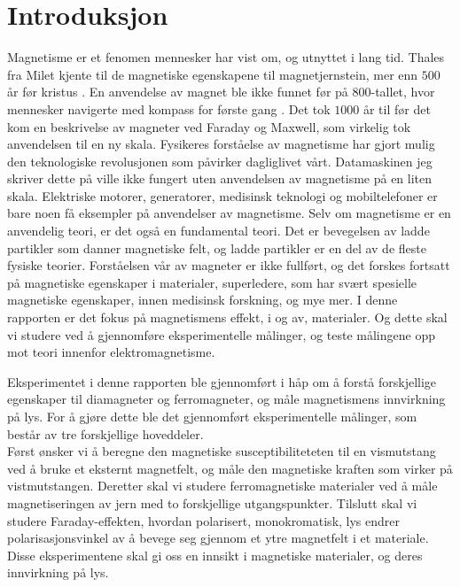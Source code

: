 \documentclass[%
 reprint,
 amsmath,amssymb,
 aps,
 norsk,
]{revtex4-1}
\begin{document}

\section{Introduksjon}
Magnetisme er et fenomen mennesker har vist om, og utnyttet i lang tid. Thales fra Milet kjente til de magnetiske egenskapene til magnetjernstein, mer enn $500$ år før kristus \cite{holtebekk_magnetisme_2017}. En anvendelse av magnet ble ikke funnet før på $800$-tallet, hvor mennesker navigerte med kompass for første gang \cite{holtebekk_magnetisme_2017}. Det tok $1000$ år til før det kom en beskrivelse av magneter ved Faraday og Maxwell, som virkelig tok anvendelsen til en ny skala. Fysikeres forståelse av magnetisme har gjort mulig den teknologiske revolusjonen som påvirker dagliglivet vårt. Datamaskinen jeg skriver dette på ville ikke fungert uten anvendelsen av magnetisme på en liten skala. Elektriske motorer, generatorer, medisinsk teknologi og mobiltelefoner er bare noen få eksempler på anvendelser av magnetisme. Selv om magnetisme er en anvendelig teori, er det også en fundamental teori. Det er bevegelsen av ladde partikler som danner magnetiske felt, og ladde partikler er en del av de fleste fysiske teorier. Forståelsen vår av magneter er ikke fullført, og det forskes fortsatt på magnetiske egenskaper i materialer, superledere, som har svært spesielle magnetiske egenskaper, innen medisinsk forskning, og mye mer.
I denne rapporten er det fokus på magnetismens effekt, i og av, materialer. Og dette skal vi studere ved å gjennomføre eksperimentelle målinger, og teste målingene opp mot teori innenfor elektromagnetisme.\par
Eksperimentet i denne rapporten ble gjennomført i håp om å forstå forskjellige egenskaper til diamagneter og ferromagneter, og måle magnetismens innvirkning på lys. For å gjøre dette ble det gjennomført eksperimentelle målinger, som består av tre forskjellige hoveddeler.\\
Først ønsker vi å beregne den magnetiske susceptibiliteteten til en vismutstang ved å bruke et eksternt magnetfelt, og måle den magnetiske kraften som virker på vistmutstangen. Deretter skal vi studere ferromagnetiske materialer ved å måle magnetiseringen av jern med to forskjellige utgangspunkter. Tilslutt skal vi studere Faraday-effekten, hvordan polarisert, monokromatisk, lys endrer polarisasjonsvinkel av å bevege seg gjennom et ytre magnetfelt i et materiale. Disse eksperimentene skal gi oss en innsikt i magnetiske materialer, og deres innvirkning på lys.
\end{document}

